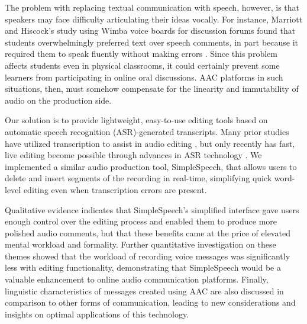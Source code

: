 The problem with replacing textual communication with speech, however, is that speakers may face difficulty articulating their ideas vocally.
For instance, Marriott and Hiscock's study using Wimba voice boards for discussion forums found that students overwhelmingly preferred text over speech comments, in part because it required them to speak fluently without making errors \cite{wimba}.
Since this problem affects students even in physical classrooms, it could certainly prevent some learners from participating in online oral discussions.
AAC platforms in such situations, then, must somehow compensate for the linearity and immutability of audio on the production side.

Our solution is to provide lightweight, easy-to-use editing tools based on automatic speech recognition (ASR)-generated transcripts.
Many prior studies have utilized transcription to assist in audio editing \cite{casares,rubin,whittaker_semantic}, but only recently has fast, live editing become possible through advances in ASR technology \cite{baker,saon}.
We implemented a similar audio production tool, SimpleSpeech, that allows users to delete and insert segments of the recording in real-time, simplifying quick word-level editing even when transcription errors are present.

Qualitative evidence indicates that SimpleSpeech's simplified interface gave users enough control over the editing process and enabled them to produce more polished audio comments, but that these benefits came at the price of elevated mental workload and formality.
Further quantitative investigation on these themes showed that the workload of recording voice messages was significantly less with editing functionality, demonstrating that SimpleSpeech would be a valuable enhancement to online audio communication platforms.
Finally, linguistic characteristics of messages created using AAC are also discussed in comparison to other forms of communication, leading to new considerations and insights on optimal applications of this technology.
